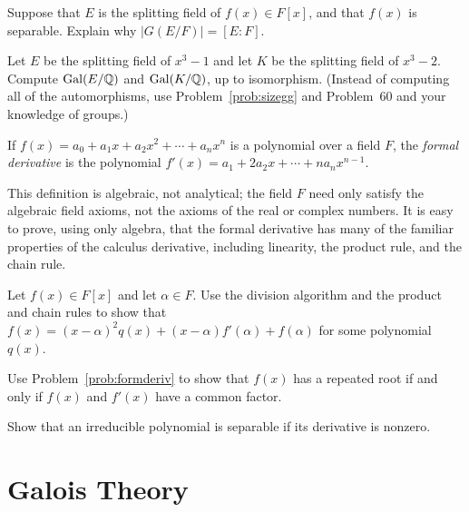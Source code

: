 \begin{problem}\label{prob:sizegg}
Suppose that $E$ is the splitting field of $f(x) \in F[x]$, and that $f(x)$ is separable.  Explain why $\lvert G(E/F) \rvert = [E:F]$.
\end{problem}



\begin{problem}
    Let $E$ be the splitting field of $x^3-1$ and let $K$ be the splitting field of $x^3-2$. Compute $\operatorname{Gal}(E/\mathbb{Q})$ and $\operatorname{Gal}(K/\mathbb{Q})$, up to isomorphism. (Instead of computing all of the automorphisms, use Problem~\ref{prob:sizegg} and Problem~60 and your knowledge of groups.)
\end{problem}



\begin{definition}
    If $f(x) = a_0 + a_1 x + a_2 x^2 + \cdots + a_n x^n$ is a polynomial over a field $F$, the \emph{formal derivative} is the polynomial $f'(x) = a_1 + 2 a_2 x + \cdots + n a_{n} x^{n-1}$.
\end{definition}

This definition is algebraic, not analytical; the field $F$ need only satisfy the algebraic field axioms, not the axioms of the real or complex numbers. It is easy to prove, using only algebra, that the formal derivative has many of the familiar properties of the calculus derivative, including linearity, the product rule, and the chain rule.

\begin{problem}\label{prob:formderiv}
Let $f(x) \in F[x]$ and let $\alpha \in F$.  Use the division algorithm and the product and chain rules to show that $f(x) = (x-\alpha)^2 q(x) +(x-\alpha)f'(\alpha) + f(\alpha)$ for some polynomial $q(x)$.
\end{problem}



\begin{problem}
    Use Problem~\ref{prob:formderiv} to show that $f(x)$ has a repeated root if and only if $f(x)$ and $f'(x)$ have a common factor.
\end{problem}



\begin{problem}
    Show that an irreducible polynomial is separable if its derivative is nonzero.
\end{problem}

\chapter{Galois Theory}

